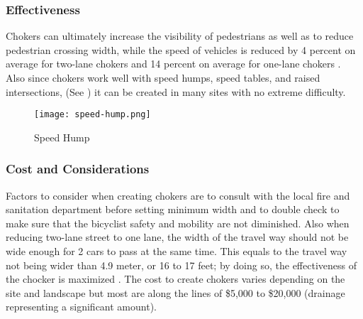 \subsubsection{Effectiveness}

Chokers can ultimately increase the visibility of pedestrians as well as to reduce pedestrian crossing width, while the speed of vehicles is reduced by 4 percent on average for two-lane chokers and 14 percent on average for one-lane chokers \cite{ite}. Also since chokers work well with speed humps, speed tables, and raised intersections, (See ) it can be created in many sites with no extreme difficulty.

\begin{figure}
\centering
\texttt{[image: speed-hump.png]}
\caption{Speed Hump}\label{fig:speed-hump}
\end{figure}

\subsubsection{Cost and Considerations}

Factors to consider when creating chokers are to consult with the local fire and sanitation department before setting minimum width and to double check to make sure that the bicyclist safety and mobility are not diminished. Also when reducing two-lane street to one lane, the width of the travel way should not be wide enough for 2 cars to pass at the same time. This equals to the travel way not being wider than 4.9 meter, or 16 to 17 feet; by doing so, the effectiveness of the chocker is maximized \cite{walking-info-chokers}. The cost to create chokers varies depending on the site and landscape but most are along the lines of \$5,000 to \$20,000 (drainage representing a significant amount).